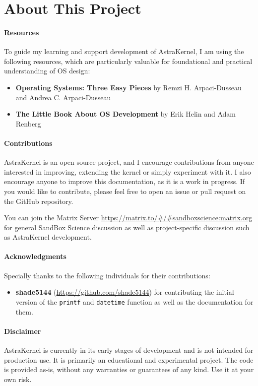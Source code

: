 \section*{About This Project}
\paragraph{Resources}

To guide my learning and support development of AstraKernel, I am using the following resources, 
which are particularly valuable for foundational and practical understanding of OS design:
\begin{itemize}
  \item \textbf{Operating Systems: Three Easy Pieces} by Remzi H. Arpaci-Dusseau and Andrea C. Arpaci-Dusseau
  \item \textbf{The Little Book About OS Development} by Erik Helin and Adam Renberg
\end{itemize}

\paragraph{Contributions}

AstraKernel is an open source project, and I encourage contributions from anyone 
interested in improving, extending the kernel or simply experiment with it. I also 
encourage anyone to improve this documentation, as it is a work in progress.
If you would like to contribute, please feel free to open an issue or pull request on the GitHub repository.
\\
\begin{info}
  You can join the Matrix Server \url{https://matrix.to/#/#sandboxscience:matrix.org} 
  for general SandBox Science discussion as well as project-specific discussion such 
  as AstraKernel development.
\end{info}

\paragraph{Acknowledgments}
Specially thanks to the following individuals for their contributions:
\begin{itemize}
  \item \textbf{shade5144} (\url{https://github.com/shade5144}) for contributing 
  the initial version of the \texttt{printf} and \texttt{datetime} function as 
  well as the documentation for them.
\end{itemize}

\paragraph{Disclaimer}

AstraKernel is currently in its early stages of development and is not intended for production use. 
It is primarily an educational and experimental project. The code is provided as-is, 
without any warranties or guarantees of any kind. Use it at your own risk.
